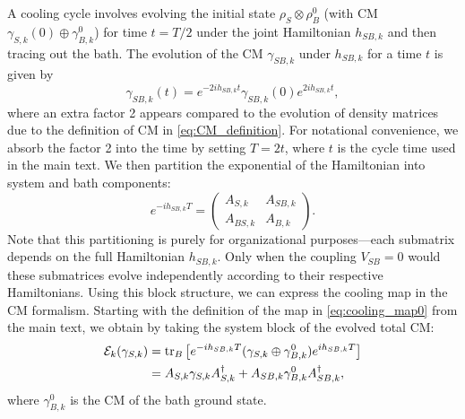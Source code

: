 A cooling cycle involves evolving the initial state $\rho_S \otimes \rho_B^0$ (with CM $\gamma_{S,k}(0) \oplus \gamma_{B,k}^{0}$) for time $t=T/2$ under the joint Hamiltonian $h_{SB,k}$ and then tracing out the bath. The evolution of the CM $\gamma_{SB,k}$ under $h_{SB,k}$ for a time $t$ is given by~\cite{Bravyi2005Lagrangian}
\begin{equation}
    \gamma_{SB,k}(t) = e^{-2i h_{SB,k}t}\gamma_{SB,k}(0)e^{2i h_{SB,k}t},
    \label{eq:gamma_evolution}
\end{equation}
where an extra factor 2 appears compared to the evolution of density matrices due to the definition of CM in \cref{eq:CM_definition}.
For notational convenience, we absorb the factor 2 into the time by setting $T=2t$, where $t$ is the cycle time used in the main text. We then partition the exponential of the Hamiltonian into system and bath components:
\begin{equation}
    e^{-ih_{SB,k}T} =
    \begin{pmatrix}
        A_{S,k}  &A_{SB,k}\\
        A_{BS,k} &A_{B,k}
    \end{pmatrix}.
    \label{eq:evolution_blocks}
\end{equation}
Note that this partitioning is purely for organizational purposes—each submatrix depends on the full Hamiltonian $h_{SB,k}$. Only when the coupling $V_{SB}=0$ would these submatrices evolve independently according to their respective Hamiltonians.
Using this block structure, we can express the cooling map in the CM formalism. Starting with the definition of the map in \cref{eq:cooling_map0} from the main text, we obtain by taking the system block of the evolved total CM:
\begin{align}
    \mathcal{E}_k(\gamma_{S,k}) &= \operatorname{tr}_B\left[e^{-i h_{SB,k} T}(\gamma_{S,k} \oplus \gamma_{B,k}^{0})e^{i h_{SB,k} T}\right] \label{eq:gamma_m_plus_1}\\
                                &= A_{S,k} \gamma_{S,k} A_{S,k}^\dag + A_{SB,k} \gamma_{B,k}^{0} A_{SB,k}^\dag, \label{eq:cooling_map_cm}
\end{align}
where $\gamma_{B,k}^{0}$ is the CM of the bath ground state.

